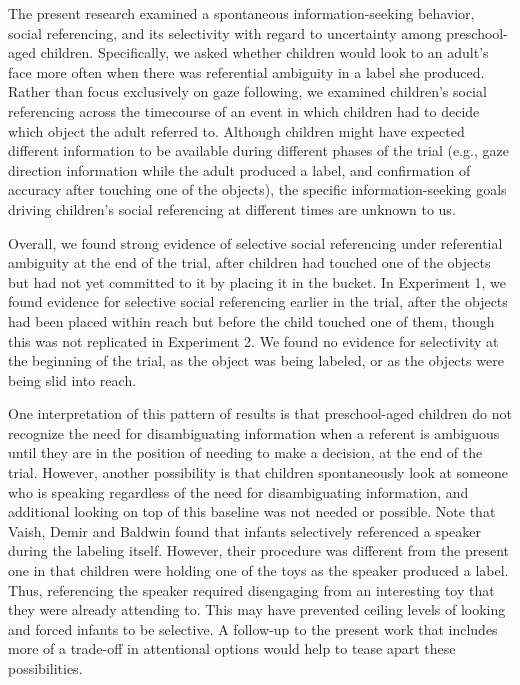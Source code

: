 \documentclass[10pt, letterpaper]{article}
\begin{document}
The present research examined a spontaneous information-seeking
behavior, social referencing, and its selectivity with regard to
uncertainty among preschool-aged children. Specifically, we asked
whether children would look to an adult's face more often when there was
referential ambiguity in a label she produced. Rather than focus
exclusively on gaze following, we examined children's social referencing
across the timecourse of an event in which children had to decide which
object the adult referred to. Although children might have expected
different information to be available during different phases of the
trial (e.g., gaze direction information while the adult produced a
label, and confirmation of accuracy after touching one of the objects),
the specific information-seeking goals driving children's social
referencing at different times are unknown to us.

Overall, we found strong evidence of selective social referencing under
referential ambiguity at the end of the trial, after children had
touched one of the objects but had not yet committed to it by placing it
in the bucket. In Experiment 1, we found evidence for selective social
referencing earlier in the trial, after the objects had been placed
within reach but before the child touched one of them, though this was
not replicated in Experiment 2. We found no evidence for selectivity at
the beginning of the trial, as the object was being labeled, or as the
objects were being slid into reach.

One interpretation of this pattern of results is that preschool-aged
children do not recognize the need for disambiguating information when a
referent is ambiguous until they are in the position of needing to make
a decision, at the end of the trial. However, another possibility is
that children spontaneously look at someone who is speaking regardless
of the need for disambiguating information, and additional looking on
top of this baseline was not needed or possible. Note that Vaish, Demir
and Baldwin found that infants selectively referenced a speaker during
the labeling itself. However, their procedure was different from the
present one in that children were holding one of the toys as the speaker
produced a label. Thus, referencing the speaker required disengaging
from an interesting toy that they were already attending to. This may
have prevented ceiling levels of looking and forced infants to be
selective. A follow-up to the present work that includes more of a
trade-off in attentional options would help to tease apart these
possibilities.
\end{document}

